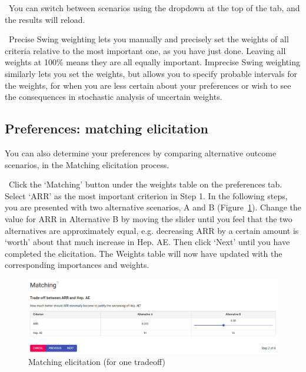 \documentclass[00_mcda_tutorial.tex]{subfiles}
\begin{document}
\noindent \faLightbulbO \, You can switch between scenarios using the dropdown at the top of the tab, and the results will reload.
\newline

\noindent \faGraduationCap \, Precise Swing weighting lets you manually and precisely set the weights of all criteria relative to the most important one, as you have just done. Leaving all weights at 100\% means they are all equally important. Imprecise Swing weighting similarly lets you set the weights, but allows you to specify probable intervals for the weights, for when you are less certain about your preferences or wish to see the consequences in stochastic analysis of uncertain weights.

\subsection*{Preferences: matching elicitation}
You can also determine your preferences by comparing alternative outcome scenarios, in the Matching elicitation process.
\newline

\noindent \leftpointright \, Click the ‘Matching’ button under the weights table on the preferences tab. Select ‘ARR’ as the most important criterion in Step 1. In the following steps, you are presented with two alternative scenarios, A and B (Figure~\ref{fig:matching1}). Change the value for ARR in Alternative B by moving the slider until you feel that the two alternatives are approximately equal, e.g. decreasing ARR by a certain amount is ‘worth’ about that much increase in Hep. AE. Then click ‘Next’ until you have completed the elicitation. The Weights table will now have updated with the corresponding importances and weights.
\newline

\begin{figure}[!h]
  \centering
  \includegraphics[width=\textwidth]{fig/matching1.png}
  \caption{Matching elicitation (for one tradeoff)}
  \label{fig:matching1}
\end{figure}
\end{document}

